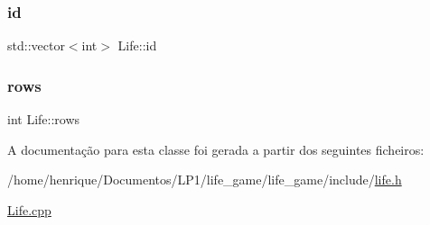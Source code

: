 \mbox{\label{classLife_ab33d6ee162673a71742a3df07a0a2e2f}} 
\subsubsection{\texorpdfstring{id}{id}}
{\footnotesize\ttfamily std\+::vector$<$int$>$ Life\+::id\hspace{0.3cm}{\ttfamily [private]}}

\mbox{\label{classLife_ab4d1ea4344ba31a4686f388edb7e2927}} 
\subsubsection{\texorpdfstring{rows}{rows}}
{\footnotesize\ttfamily int Life\+::rows\hspace{0.3cm}{\ttfamily [private]}}



A documentação para esta classe foi gerada a partir dos seguintes ficheiros\+:\begin{DoxyCompactItemize}
\item 
/home/henrique/\+Documentos/\+L\+P1/life\+\_\+game/life\+\_\+game/include/\hyperlink{life_8h}{life.\+h}\item 
\hyperlink{Life_8cpp}{Life.\+cpp}\end{DoxyCompactItemize}
